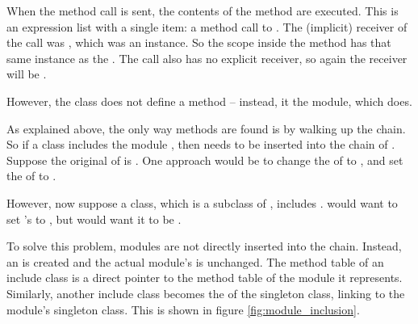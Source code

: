 When the  method call is sent, the contents of the method are executed. This is an expression list with a single item: a method call to . The (implicit) receiver of the  call was , which was an  instance. So the scope inside the method has that same  instance as the . The  call also has no explicit receiver, so again the receiver will be .

However, the  class does not define a  method -- instead, it  the  module, which does.

As explained above, the only way methods are found is by walking up the  chain. So if a class  includes the module , then  needs to be inserted into the  chain of . Suppose the original  of  is . One approach would be to change the  of  to , and set the  of  to .

However, now suppose a  class, which is a subclass of , includes .  would want to set 's  to , but  would want it to be .

To solve this problem, modules are not directly inserted into the  chain. Instead, an  is created and the actual module's  is unchanged. The method table of an include class is a direct pointer to the method table of the module it represents. Similarly, another include class becomes the  of the singleton class, linking to the module's singleton class. This is shown in figure \ref{fig:module_inclusion}.

